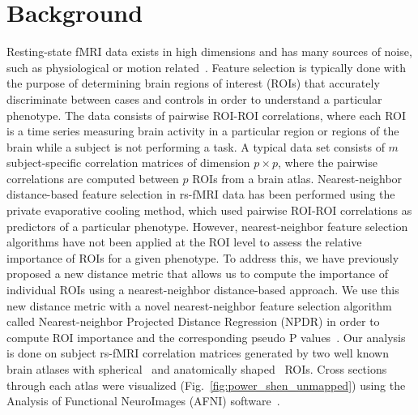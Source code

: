 \documentclass[10pt,letterpaper]{article}\usepackage[]{graphicx}\usepackage[]{color}
\begin{document}
\section{Background}
Resting-state fMRI data exists in high dimensions and has many sources of noise, such as physiological or motion related~\cite{caballero2017}. Feature selection is typically done with the purpose of determining brain regions of interest (ROIs) that accurately discriminate between cases and controls in order to understand a particular phenotype. The data consists of pairwise ROI-ROI correlations, where each ROI is a time series measuring brain activity in a particular region or regions of the brain while a subject is not performing a task. A typical data set consists of $m$ subject-specific correlation matrices of dimension $p \times p$, where the pairwise correlations are computed between $p$ ROIs from a brain atlas. Nearest-neighbor distance-based feature selection in rs-fMRI data has been performed using the private evaporative cooling method, which used pairwise ROI-ROI correlations as predictors of a particular phenotype. However, nearest-neighbor feature selection algorithms have not been applied at the ROI level to assess the relative importance of ROIs for a given phenotype. To address this, we have previously proposed a new distance metric that allows us to compute the importance of individual ROIs using a nearest-neighbor distance-based approach. We use this new distance metric with a novel nearest-neighbor feature selection algorithm called Nearest-neighbor Projected Distance Regression (NPDR) in order to compute ROI importance and the corresponding pseudo P values~\cite{npdr}. Our analysis is done on subject rs-fMRI correlation matrices generated by two well known brain atlases with spherical~\cite{power2011} and anatomically shaped~\cite{shen2013} ROIs. Cross sections through each atlas were visualized (Fig.~\ref{fig:power_shen_unmapped}) using the Analysis of Functional NeuroImages (AFNI) software~\cite{cox1996}.

\vspace{0.25cm}
\end{document}
